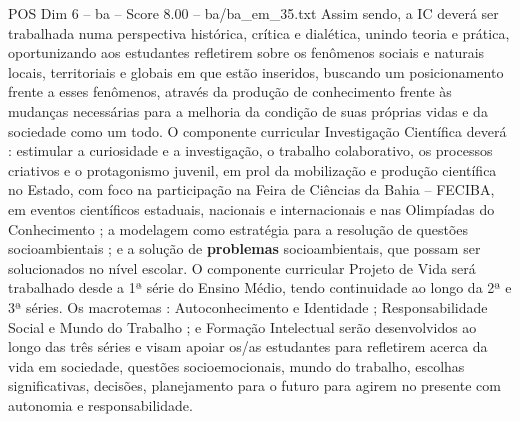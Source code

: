 \begin{textsample}{POS Dim 6 – ba – Score 8.00 – ba/ba\_em\_35.txt}
Assim sendo, a IC deverá ser trabalhada numa perspectiva histórica, crítica e dialética, unindo teoria e prática, oportunizando aos estudantes refletirem sobre os fenômenos sociais e naturais locais, territoriais e globais em que estão inseridos, buscando um posicionamento frente a esses fenômenos, através da produção de conhecimento frente às mudanças necessárias para a melhoria da condição de suas próprias vidas e da sociedade como um todo.
O componente curricular Investigação Científica deverá : estimular a curiosidade e a investigação, o trabalho colaborativo, os processos criativos e o protagonismo juvenil, em prol da mobilização e produção científica no Estado, com foco na participação na Feira de Ciências da Bahia – FECIBA, em eventos científicos estaduais, nacionais e internacionais e nas Olimpíadas do Conhecimento ; a modelagem como estratégia para a resolução de questões socioambientais ; e a solução de \textbf{problemas} socioambientais, que possam ser solucionados no nível escolar.
O componente curricular Projeto de Vida será trabalhado desde a 1ª série do Ensino Médio, tendo continuidade ao longo da 2ª e 3ª séries.
Os macrotemas : Autoconhecimento e Identidade ; Responsabilidade Social e Mundo do Trabalho ; e Formação Intelectual serão desenvolvidos ao longo das três séries e visam apoiar os/as estudantes para refletirem acerca da vida em sociedade, questões socioemocionais, mundo do trabalho, escolhas significativas, decisões, planejamento para o futuro para agirem no presente com autonomia e responsabilidade.

\end{textsample}
